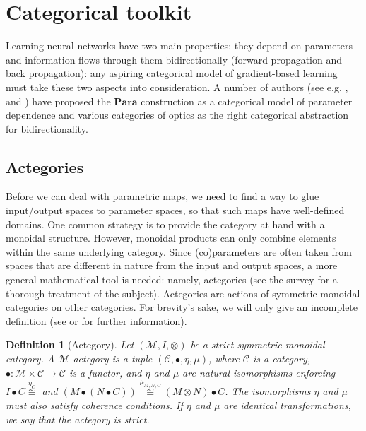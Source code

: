 \documentclass[11pt,a4paper,openright,twoside]{report}
\newcounter{mycounter}
\theoremstyle{plain}
\newtheorem{definition}[mycounter]{Definition}
\theoremstyle{definition}
\begin{document}
\section{Categorical toolkit}

Learning neural networks have two main properties: they depend on parameters and information flows through them bidirectionally (forward propagation and back propagation): any aspiring categorical model of gradient-based learning must take these two aspects into consideration. A number of authors (see e.g. \cite{gavranovic2024fundamental}, and \cite{cruttwell2022categorical}) have proposed the $\mathbf{Para}$ construction as a categorical model of parameter dependence and various categories of optics as the right categorical abstraction for bidirectionality.

\subsection{Actegories}

Before we can deal with parametric maps, we need to find a way to glue input/output spaces to parameter spaces, so that such maps have well-defined domains. One common strategy is to provide the category at hand with a monoidal structure. However, monoidal products can only combine elements within the same underlying category. Since (co)parameters are often taken from spaces that are different in nature from the input and output spaces, a more general mathematical tool is needed: namely, actegories (see the survey \cite{capucci2022actegories} for a thorough treatment of the subject).  Actegories are actions of symmetric monoidal categories on other categories. For brevity's sake, we will only give an incomplete definition (see \cite{capucci2022actegories} or \cite{gavranovic2024fundamental} for further information).

\begin{definition}[Actegory]
  Let $(\mathcal{M},I,\otimes)$ be a strict symmetric monoidal category. A $\mathcal{M}$-actegory is a tuple $(\mathcal{C}, \bullet, \eta, \mu)$, where $\mathcal{C}$ is a category, $\bullet: \mathcal{M} \times \mathcal{C} \to \mathcal{C}$ is a functor, and $\eta$ and $\mu$ are natural isomorphisms enforcing $I \bullet C \stackrel{\eta_C}{\cong}$ and $(M \bullet (N \bullet C)) \stackrel{\mu_{M,N,C}}{\cong} (M \otimes N) \bullet C$.
  The isomorphisms $\eta$ and $\mu$ must also satisfy coherence conditions. If $\eta$ and $\mu$ are identical transformations, we say that the actegory is strict.
\end{definition}
\end{document}
